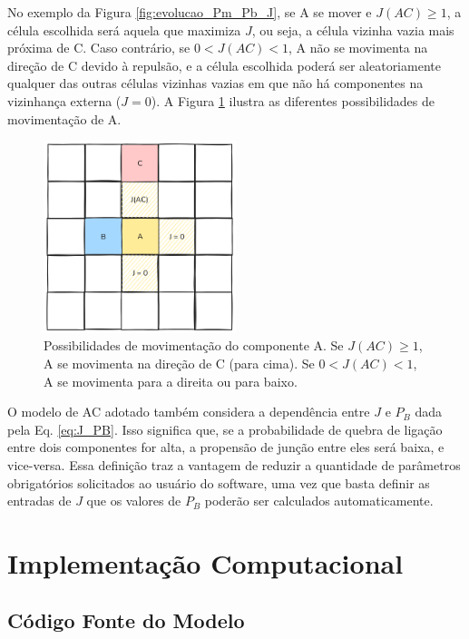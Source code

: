 \documentclass[12pt,oneside]{report}
\begin{document}
No exemplo da Figura \ref{fig:evolucao_Pm_Pb_J}, se A se mover e $J(AC) \geq 1$, a célula escolhida será aquela que maximiza $J$, ou seja, a célula vizinha vazia mais próxima de C. Caso contrário, se $0 < J(AC) < 1$, A não se movimenta na direção de C devido à repulsão, e a célula escolhida poderá ser aleatoriamente qualquer das outras células vizinhas vazias em que não há componentes na vizinhança externa ($J = 0$). A Figura \ref{fig:evolucao_A} ilustra as diferentes possibilidades de movimentação de A.

\begin{figure}[H]
    \centering
    \includegraphics[width=0.5\textwidth]{evolucao_A.png}
    \caption{\small Possibilidades de movimentação do componente A. Se $J(AC) \geq 1$, A se movimenta na direção de C (para cima). Se $0 < J(AC) < 1$, A se movimenta para a direita ou para baixo.}
    \label{fig:evolucao_A}
\end{figure}

O modelo de AC adotado também considera a dependência entre $J$ e $P_B$ dada pela Eq. \ref{eq:J_PB}. Isso significa que, se a probabilidade de quebra de ligação entre dois componentes for alta, a propensão de junção entre eles será baixa, e vice-versa. Essa definição traz a vantagem de reduzir a quantidade de parâmetros obrigatórios solicitados ao usuário do software, uma vez que basta definir as entradas de $J$ que os valores de $P_B$ poderão ser calculados automaticamente.


\section{Implementação Computacional}

\subsection{Código Fonte do Modelo}
\end{document}
